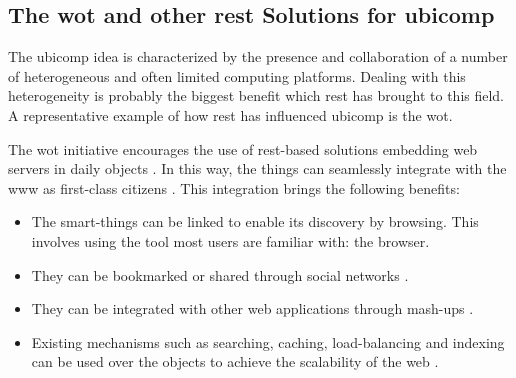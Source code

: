 \subsection{The \acl{wot} and other \ac{rest} Solutions for \acs{ubicomp}}

The \ac{ubicomp} idea is characterized by the presence and collaboration of a number of heterogeneous and often limited computing platforms.
Dealing with this heterogeneity is probably the biggest benefit which \ac{rest} has brought to this field.
A representative example of how \ac{rest} has influenced \ac{ubicomp} is the \acf{wot}.




The \acl{wot} initiative encourages the use of \acs{rest}-based solutions embedding web servers in daily objects \citep{guinard_internet_2011,guinard_thesis_2011}.
In this way, the things can seamlessly integrate with the \ac{www} as first-class citizens \citep{gupta_network_2011}. %
This integration brings the following benefits:
\begin{itemize}
  \item The smart-things can be linked to enable its discovery by browsing.
	This involves using the tool most users are familiar with: the browser.
  \item They can be bookmarked or shared through social networks \citep{guinard_sharing_2010}.
  \item They can be integrated with other web applications through mash-ups \citep{guinard_towards_2009,ostermaier_webplug:_2010,pintus_anatomy_2011,blackstock_wotkit:_2012,stirbu_towards_2008}.
  \item Existing mechanisms such as searching, caching, load-balancing and indexing can be used over the objects to achieve the scalability of the web \citep{gupta_early_2010}.
\end{itemize}




